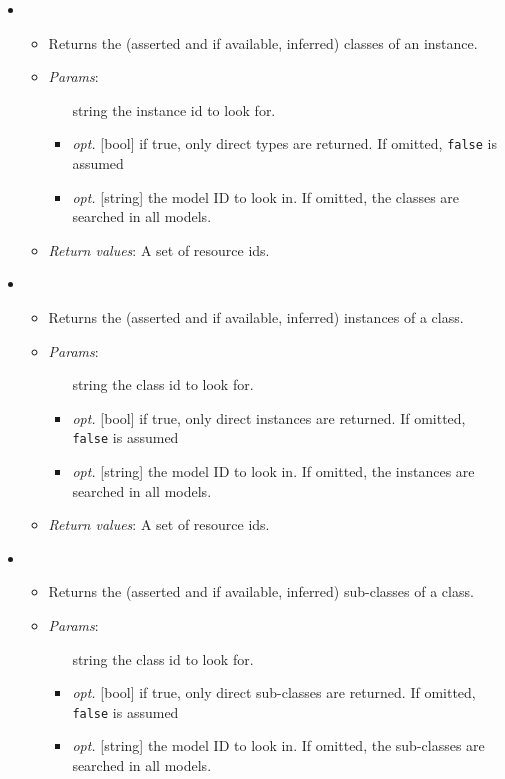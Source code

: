\begin{itemize}
\item  {}
\begin{itemize}
\item  Returns the (asserted and if available, inferred) classes of an instance.
\item  \emph{Params}:
\begin{itemize}
\item  [string] the instance id to look for.
\item  \emph{opt.} [bool] if true, only direct types are returned. If omitted, \texttt{false} is assumed 
\item  \emph{opt.} [string] the model ID to look in. If omitted, the classes are searched in all models. 
\end{itemize}

\item  \emph{Return values}: A set of resource ids.
\end{itemize}

\item  {}
\begin{itemize}
\item  Returns the (asserted and if available, inferred) instances of a class.
\item  \emph{Params}:
\begin{itemize}
\item  [string] the class id to look for.
\item  \emph{opt.} [bool] if true, only direct instances are returned. If omitted, \texttt{false} is assumed 
\item  \emph{opt.} [string] the model ID to look in. If omitted, the instances are searched in all models. 
\end{itemize}

\item  \emph{Return values}: A set of resource ids.
\end{itemize}

\item  {}
\begin{itemize}
\item  Returns the (asserted and if available, inferred) sub-classes of a class.
\item  \emph{Params}:
\begin{itemize}
\item  [string] the class id to look for.
\item  \emph{opt.} [bool] if true, only direct sub-classes are returned. If omitted, \texttt{false} is assumed 
\item  \emph{opt.} [string] the model ID to look in. If omitted, the sub-classes are searched in all models. 
\end{itemize}


\end{itemize}
\end{itemize}
